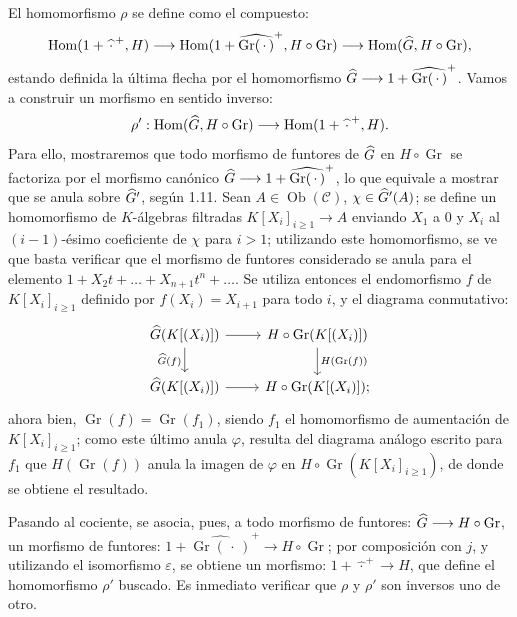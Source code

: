 El homomorfismo \(\rho\) se define como el compuesto:
\[
  \operatorname{Hom}(1+\widehat{\,\cdot\,}^{+},H)
  \longrightarrow
  \operatorname{Hom}(1+\widehat{\operatorname{Gr}(\,\cdot\,)}^{+},H\circ\operatorname{Gr})
  \longrightarrow
  \operatorname{Hom}(\widehat G,H\circ\operatorname{Gr}),
\]
estando definida la última flecha por el homomorfismo \(\widehat G\longrightarrow1+\widehat{\operatorname{Gr}(\,\cdot\,)}^{+}\).
Vamos a construir un morfismo en sentido inverso:
\[
  \rho':\operatorname{Hom}(\widehat G,H\circ\operatorname{Gr})
  \longrightarrow
  \operatorname{Hom}(1+\widehat{\,\cdot\,}^{+},H).
\]
Para ello, mostraremos que todo morfismo de funtores de \(\widehat G\) en \(H\circ\operatorname{Gr}\) se factoriza por el morfismo canónico \(\widehat G\longrightarrow1+\widehat{\operatorname{Gr}(\,\cdot\,)}^{+}\), lo que equivale a mostrar que se anula sobre \(\widehat G'\), según 1.11. Sean \(A\in\operatorname{Ob}(\mathcal C)\), \(\chi\in\widehat G'(A)\); se define un homomorfismo de \(K\)-álgebras filtradas \(K[X_i]_{i\geq1}\longrightarrow A\) enviando \(X_1\) a \(0\) y \(X_i\) al \((i-1)\)-ésimo coeficiente de \(\chi\) para \(i>1\); utilizando este homomorfismo, se ve que basta verificar que el morfismo de funtores considerado se anula para el elemento \(1+X_2t+\ldots+X_{n+1}t^n+\ldots\). Se utiliza entonces el endomorfismo \(f\) de \(K[X_i]_{i\geq1}\) definido por \(f(X_i)=X_{i+1}\) para todo \(i\), y el diagrama conmutativo:
\[
\begin{tikzcd}
\Ghat(K[(X_i)]) \arrow[r] \arrow[d,"\Ghat(f)"'] &
H\circ\operatorname{Gr}(K[(X_i)]) \arrow[d,"H(\operatorname{Gr}(f))"]\\
\Ghat(K[(X_i)]) \arrow[r] &
H\circ\operatorname{Gr}(K[(X_i)]);
\end{tikzcd}
\]
ahora bien, \(\operatorname{Gr}(f)=\operatorname{Gr}(f_1)\), siendo \(f_1\) el homomorfismo de aumentación de \(K[X_i]_{i\geq1}\); como este último anula \(\varphi\), resulta del diagrama análogo escrito para \(f_1\) que \(H(\operatorname{Gr}(f))\) anula la imagen de \(\varphi\) en \(H\circ\operatorname{Gr}(K[X_i]_{i\geq1})\), de donde se obtiene el resultado.

Pasando al cociente, se asocia, pues, a todo morfismo de funtores: \(\widehat G\longrightarrow H\circ\operatorname{Gr}\), un morfismo de funtores: \(1+\widehat{\operatorname{Gr}(\,\cdot\,)}^{+}\longrightarrow H\circ\operatorname{Gr}\); por composición con \(j\), y utilizando el isomorfismo \(\varepsilon\), se obtiene un morfismo: \(1+\widehat{\,\cdot\,}^{+}\longrightarrow H\), que define el homomorfismo \(\rho'\) buscado. Es inmediato verificar que \(\rho\) y \(\rho'\) son inversos uno de otro.

